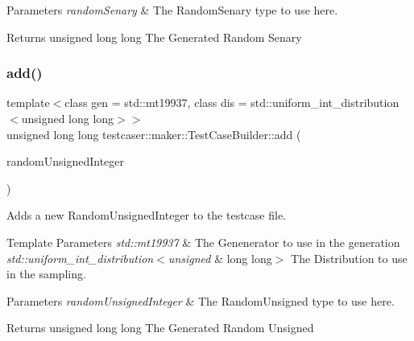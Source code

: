 \begin{DoxyParams}{Parameters}
{\em random\+Senary} & The Random\+Senary type to use here. \\
\hline
\end{DoxyParams}
\begin{DoxyReturn}{Returns}
unsigned long long The Generated Random Senary 
\end{DoxyReturn}
\mbox{\label{classtestcaser_1_1maker_1_1TestCaseBuilder_a31403b4d313d7e3933252bcd89e4a060}} 
\subsubsection{\texorpdfstring{add()}{add()}\hspace{0.1cm}{\footnotesize\ttfamily [10/11]}}
{\footnotesize\ttfamily template$<$class gen  = std\+::mt19937, class dis  = std\+::uniform\+\_\+int\+\_\+distribution$<$unsigned long long$>$$>$ \\
unsigned long long testcaser\+::maker\+::\+Test\+Case\+Builder\+::add (\begin{DoxyParamCaption}\item[{\mbox{\hyperlink{classtestcaser_1_1maker_1_1types_1_1RandomUnsignedInteger}{types\+::\+Random\+Unsigned\+Integer}}$<$ gen, dis $>$ \&}]{random\+Unsigned\+Integer }\end{DoxyParamCaption})\hspace{0.3cm}{\ttfamily [inline]}}



Adds a new Random\+Unsigned\+Integer to the testcase file. 


\begin{DoxyTemplParams}{Template Parameters}
{\em std\+::mt19937} & The Genenerator to use in the generation \\
\hline
{\em std\+::uniform\+\_\+int\+\_\+distribution$<$unsigned} & long long$>$ The Distribution to use in the sampling. \\
\hline
\end{DoxyTemplParams}

\begin{DoxyParams}{Parameters}
{\em random\+Unsigned\+Integer} & The Random\+Unsigned type to use here. \\
\hline
\end{DoxyParams}
\begin{DoxyReturn}{Returns}
unsigned long long The Generated Random Unsigned 
\end{DoxyReturn}
\mbox{\label{classtestcaser_1_1maker_1_1TestCaseBuilder_a9c3e973820d032cce82ab0d070c700f9}} 
